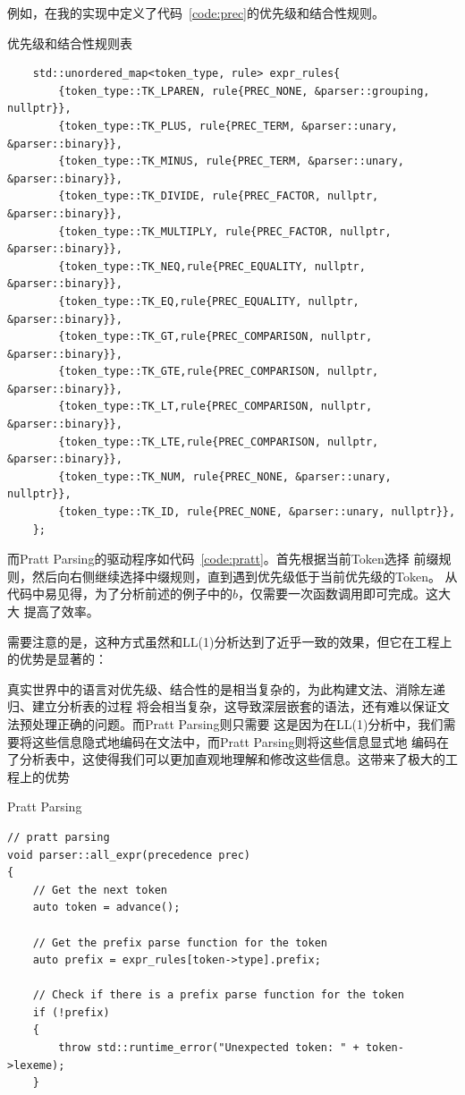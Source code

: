 \documentclass[a4paper,twoside]{article}
\begin{document}
\begin{spacing}{1.2}
例如，在我的实现中定义了代码~\ref{code:prec}的优先级和结合性规则。
\begin{listing}[htb]
	\caption{优先级和结合性规则表}
	\label{code:prec}
	\begin{verbatim}
	std::unordered_map<token_type, rule> expr_rules{
		{token_type::TK_LPAREN, rule{PREC_NONE, &parser::grouping, nullptr}},
		{token_type::TK_PLUS, rule{PREC_TERM, &parser::unary, &parser::binary}},
		{token_type::TK_MINUS, rule{PREC_TERM, &parser::unary, &parser::binary}},
		{token_type::TK_DIVIDE, rule{PREC_FACTOR, nullptr, &parser::binary}},
		{token_type::TK_MULTIPLY, rule{PREC_FACTOR, nullptr, &parser::binary}},
		{token_type::TK_NEQ,rule{PREC_EQUALITY, nullptr, &parser::binary}},
		{token_type::TK_EQ,rule{PREC_EQUALITY, nullptr, &parser::binary}},
		{token_type::TK_GT,rule{PREC_COMPARISON, nullptr, &parser::binary}},
		{token_type::TK_GTE,rule{PREC_COMPARISON, nullptr, &parser::binary}},
		{token_type::TK_LT,rule{PREC_COMPARISON, nullptr, &parser::binary}},
		{token_type::TK_LTE,rule{PREC_COMPARISON, nullptr, &parser::binary}},
		{token_type::TK_NUM, rule{PREC_NONE, &parser::unary, nullptr}},
		{token_type::TK_ID, rule{PREC_NONE, &parser::unary, nullptr}},
	};
	\end{verbatim}
\end{listing}
而Pratt Parsing的驱动程序如代码~\ref{code:pratt}。首先根据当前Token选择
前缀规则，然后向右侧继续选择中缀规则，直到遇到优先级低于当前优先级的Token。
从代码中易见得，为了分析前述的例子中的$b$，仅需要一次函数调用即可完成。这大大
提高了效率。

需要注意的是，这种方式虽然和LL(1)分析达到了近乎一致的效果，但它在工程上的优势是显著的：

真实世界中的语言对优先级、结合性的是相当复杂的，为此构建文法、消除左递归、建立分析表的过程
将会相当复杂，这导致深层嵌套的语法，还有难以保证文法预处理正确的问题。而Pratt Parsing则只需要
这是因为在LL(1)分析中，我们需要将这些信息隐式地编码在文法中，而Pratt Parsing则将这些信息显式地
编码在了分析表中，这使得我们可以更加直观地理解和修改这些信息。这带来了极大的工程上的优势

\begin{listing}[htb]
	\caption{Pratt Parsing}
	\label{code:pratt}
	\begin{verbatim}
// pratt parsing
void parser::all_expr(precedence prec)
{
	// Get the next token
	auto token = advance();

	// Get the prefix parse function for the token
	auto prefix = expr_rules[token->type].prefix;

	// Check if there is a prefix parse function for the token
	if (!prefix)
	{
		throw std::runtime_error("Unexpected token: " + token->lexeme);
	}


\end{verbatim}
\end{listing}
\end{spacing}
\end{document}
